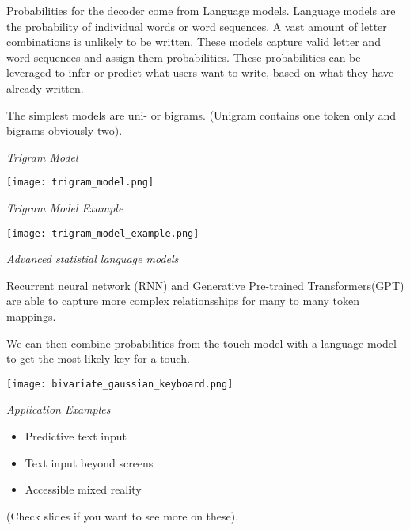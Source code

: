 Probabilities for the decoder come from Language models. Language models are the probability of individual words or word sequences. 
A vast amount of letter combinations is unlikely to be written. These models capture valid letter and word sequences and assign them probabilities. 
These probabilities can be leveraged to infer or predict what users want to write, based on what they have already written. \medskip

The simplest models are uni- or bigrams. (Unigram contains one token only and bigrams obviously two). \medskip

\textit{Trigram Model}

\begin{center}
	\texttt{[image: trigram\_model.png]}
\end{center}

\textit{Trigram Model Example}

\begin{center}
	\texttt{[image: trigram\_model\_example.png]}
\end{center}

\textit{Advanced statistial language models} \smallskip

Recurrent neural network (RNN) and Generative Pre-trained Transformers(GPT) are able to capture more complex relationsships for many to many token mappings. 

\medskip

We can then combine probabilities from the touch model with a language model to get the most likely key for a touch. 


\begin{center}
	\texttt{[image: bivariate\_gaussian\_keyboard.png]}
\end{center}

\textit{Application Examples} \smallskip

\begin{itemize}[itemsep=-5pt, topsep=0pt, leftmargin=*]
	\item Predictive text input
	\item Text input beyond screens
	\item Accessible mixed reality
\end{itemize}

(Check slides if you want to see more on these).
